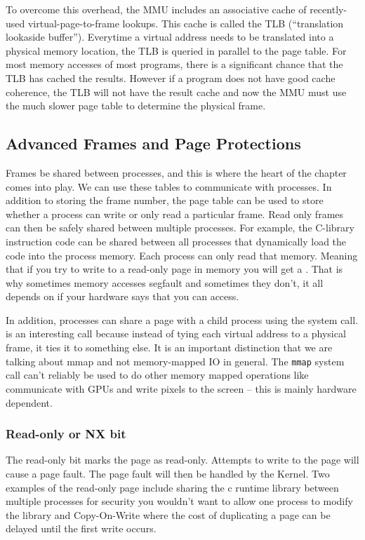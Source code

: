 To overcome this overhead, the MMU includes an associative cache of recently-used virtual-page-to-frame lookups.
This cache is called the TLB (``translation lookaside buffer'').
Everytime a virtual address needs to be translated into a physical memory location, the TLB is queried in parallel to the page table.
For most memory accesses of most programs, there is a significant chance that the TLB has cached the results.
However if a program does not have good cache coherence, the TLB will not have the result cache and now the MMU must use the much slower page table to determine the physical frame.

\subsection{Advanced Frames and Page Protections}

Frames be shared between processes, and this is where the heart of the chapter comes into play.
We can use these tables to communicate with processes.
In addition to storing the frame number, the page table can be used to store whether a process can write or only read a particular frame.
Read only frames can then be safely shared between multiple processes.
For example, the C-library instruction code can be shared between all processes that dynamically load the code into the process memory.
Each process can only read that memory.
Meaning that if you try to write to a read-only page in memory you will get a .
That is why sometimes memory accesses segfault and sometimes they don't, it all depends on if your hardware says that you can access.

In addition, processes can share a page with a child process using the  system call.
 is an interesting call because instead of tying each virtual address to a physical frame, it ties it to something else. It is an important distinction that we are talking about mmap and not memory-mapped IO in general. The \texttt{mmap} system call can't reliably be used to do other memory mapped operations like communicate with GPUs and write pixels to the screen -- this is mainly hardware dependent.

\subsubsection{Read-only or NX bit}

The read-only bit marks the page as read-only.
Attempts to write to the page will cause a page fault.
The page fault will then be handled by the Kernel.
Two examples of the read-only page include sharing the c runtime library between multiple processes for security you wouldn't want to allow one process to modify the library and Copy-On-Write where the cost of duplicating a page can be delayed until the first write occurs.

